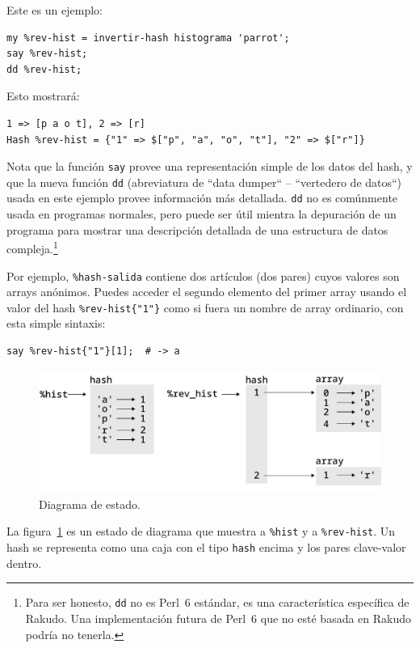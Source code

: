 Este es un ejemplo:

\begin{verbatim}
my %rev-hist = invertir-hash histograma 'parrot';
say %rev-hist;
dd %rev-hist;
\end{verbatim}

Esto mostrará:

\begin{verbatim}
1 => [p a o t], 2 => [r]
Hash %rev-hist = {"1" => $["p", "a", "o", "t"], "2" => $["r"]}
\end{verbatim}

Nota que la función {\tt say} provee una representación simple
de los datos del hash, y que la nueva función {\tt dd} (abreviatura 
de ``data dumper`` -- ``vertedero de datos``) usada en este ejemplo
provee información más detallada. {\tt dd} no es comúnmente usada en 
programas normales, pero puede ser útil mientra la depuración de un
programa para mostrar una descripción detallada de una estructura de 
datos compleja.\footnote{Para ser honesto, {\tt dd} no es Perl~6 estándar,
es una característica específica de Rakudo. Una implementación futura de Perl~6 que
no esté basada en Rakudo podría no tenerla.}

Por ejemplo, \verb|%hash-salida| contiene dos artículos (dos pares)
cuyos valores son arrays anónimos. Puedes acceder el segundo elemento
del primer array usando el valor del hash \verb|%rev-hist{"1"}|
como si fuera un nombre de array ordinario, con esta simple sintaxis:

\begin{verbatim}
say %rev-hist{"1"}[1];  # -> a
\end{verbatim}


\begin{figure}
\centerline
{\includegraphics[scale=0.8]{figs/hash1.pdf}}
\caption{Diagrama de estado.}
\label{fig.hash1}
\end{figure}

La figura~\ref{fig.hash1} es un estado de diagrama que muestra a \verb|%hist| 
y a \verb|%rev-hist|. Un hash se representa como una caja con el tipo {\tt hash}
encima y los pares clave-valor dentro.

